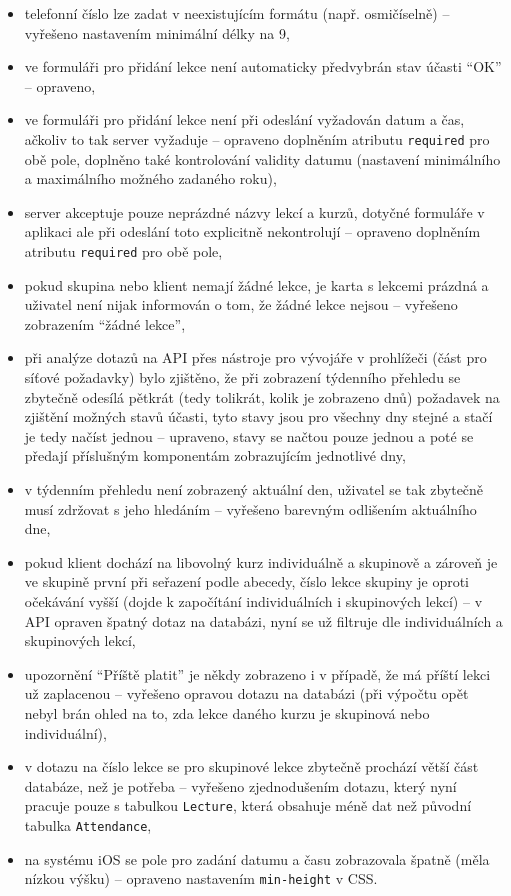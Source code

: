         \begin{itemize}
            \item telefonní číslo lze zadat v neexistujícím formátu (např. osmičíselně) -- vyřešeno nastavením minimální délky na 9,
            \item ve formuláři pro přidání lekce není automaticky předvybrán stav účasti \enquote{OK} -- opraveno,
            \item ve formuláři pro přidání lekce není při odeslání vyžadován datum a čas, ačkoliv to tak server vyžaduje -- opraveno doplněním atributu \verb|required| pro obě pole, doplněno také kontrolování validity datumu (nastavení minimálního a maximálního možného zadaného roku),
            \item server akceptuje pouze neprázdné názvy lekcí a kurzů, dotyčné formuláře v aplikaci ale při odeslání toto explicitně nekontrolují -- opraveno doplněním atributu \verb|required| pro obě pole,
            \item pokud skupina nebo klient nemají žádné lekce, je karta s lekcemi prázdná a uživatel není nijak informován o tom, že žádné lekce nejsou -- vyřešeno zobrazením \enquote{žádné lekce},
            \item při analýze dotazů na API přes nástroje pro vývojáře v prohlížeči (část pro síťové požadavky) bylo zjištěno, že při zobrazení týdenního přehledu se zbytečně odesílá pětkrát (tedy tolikrát, kolik je zobrazeno dnů) požadavek na zjištění možných stavů účasti, tyto stavy jsou pro všechny dny stejné a stačí je tedy načíst jednou -- upraveno, stavy se načtou pouze jednou a poté se předají příslušným komponentám zobrazujícím jednotlivé dny,
            \item v týdenním přehledu není zobrazený aktuální den, uživatel se tak zbytečně musí zdržovat s jeho hledáním -- vyřešeno barevným odlišením aktuálního dne,
            \item pokud klient dochází na libovolný kurz individuálně a skupinově a zároveň je ve skupině první při seřazení podle abecedy, číslo lekce skupiny je oproti očekávání vyšší (dojde k započítání individuálních i skupinových lekcí) -- v API opraven špatný dotaz na databázi, nyní se už filtruje dle individuálních a skupinových lekcí,
            \item upozornění \enquote{Příště platit} je někdy zobrazeno i v případě, že má příští lekci už zaplacenou -- vyřešeno opravou dotazu na databázi (při výpočtu opět nebyl brán ohled na to, zda lekce daného kurzu je skupinová nebo individuální),
            \item v dotazu na číslo lekce se pro skupinové lekce zbytečně prochází větší část databáze, než je potřeba -- vyřešeno zjednodušením dotazu, který nyní pracuje pouze s tabulkou \verb|Lecture|, která obsahuje méně dat než původní tabulka \verb|Attendance|,
            \item na systému iOS se pole pro zadání datumu a času zobrazovala špatně (měla nízkou výšku) -- opraveno nastavením \verb|min-height| v CSS.
        \end{itemize}
    
